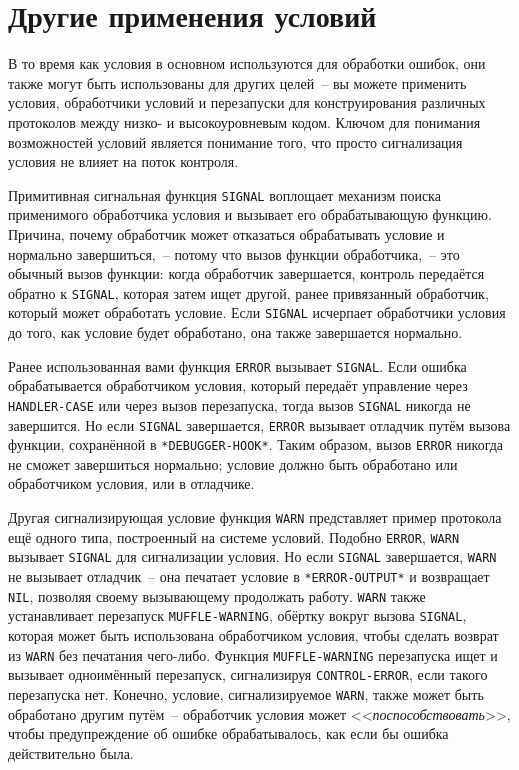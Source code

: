 \section{Другие применения условий}
\label{ch19:other-appls}

В то время как условия в основном используются для обработки ошибок, они также могут быть
использованы для других целей~-- вы можете применить условия, обработчики условий и
перезапуски для конструирования различных протоколов между низко- и высокоуровневым
кодом. Ключом для понимания возможностей условий является понимание того, что просто
сигнализация условия не влияет на поток контроля.

Примитивная сигнальная функция \lstinline{SIGNAL} воплощает механизм поиска применимого
обработчика условия и вызывает его обрабатывающую функцию. Причина, почему обработчик
может отказаться обрабатывать условие и нормально завершиться,~-- потому что вызов
функции обработчика,~-- это обычный вызов функции: когда обработчик завершается, контроль
передаётся обратно к \lstinline{SIGNAL}, которая затем ищет другой, ранее привязанный
обработчик, который может обработать условие. Если \lstinline{SIGNAL} исчерпает обработчики
условия до того, как условие будет обработано, она также завершается нормально.

Ранее использованная вами функция \lstinline{ERROR} вызывает \lstinline{SIGNAL}. Если ошибка
обрабатывается обработчиком условия, который передаёт управление через \lstinline{HANDLER-CASE}
или через вызов перезапуска, тогда вызов \lstinline{SIGNAL} никогда не завершится. Но если
\lstinline{SIGNAL} завершается, \lstinline{ERROR} вызывает отладчик путём вызова функции,
сохранённой в \lstinline{*DEBUGGER-HOOK*}. Таким образом, вызов \lstinline{ERROR} никогда не сможет
завершиться нормально; условие должно быть обработано или обработчиком условия, или в
отладчике.

Другая сигнализирующая условие функция \lstinline{WARN} представляет пример протокола ещё
одного типа, построенный на системе условий. Подобно \lstinline{ERROR}, \lstinline{WARN}
вызывает \lstinline{SIGNAL} для сигнализации условия. Но если \lstinline{SIGNAL}
завершается, \lstinline{WARN} не вызывает отладчик~-- она печатает условие в
\lstinline{*ERROR-OUTPUT*} и возвращает \lstinline{NIL}, позволяя своему вызывающему
продолжать работу. \lstinline{WARN} также устанавливает перезапуск
\lstinline{MUFFLE-WARNING}, обёртку вокруг вызова \lstinline{SIGNAL}, которая может быть
использована обработчиком условия, чтобы сделать возврат из \lstinline{WARN} без печатания
чего-либо. Функция \lstinline{MUFFLE-WARNING} перезапуска ищет и вызывает одноимённый
перезапуск, сигнализируя \lstinline{CONTROL-ERROR}, если такого перезапуска нет. Конечно,
условие, сигнализируемое \lstinline{WARN}, также может быть обработано другим путём~--
обработчик условия может <<\textit{поспособствовать}>>, чтобы предупреждение об ошибке
обрабатывалось, как если бы ошибка действительно была.

